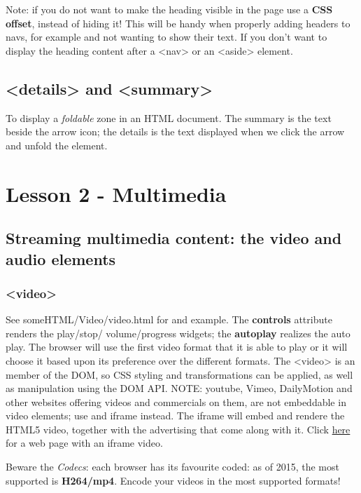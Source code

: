 \documentclass[a4paper,11pt]{book}
\begin{document}
    Note: if you do not want to make the heading visible in the page use a \textbf{CSS offset}, instead of
    hiding it! This will be handy when properly adding headers to navs, for example and not wanting to
    show their text. If you don't want to display the heading content after a <nav> or an <aside> element.

    \section{<details> and <summary>}
    To display a \emph{foldable} zone in an HTML document.
    The summary is the text beside the arrow icon; the details is the text displayed when we click the arrow
    and unfold the element.

\chapter{Lesson 2 - Multimedia}
    \section{Streaming multimedia content: the video and audio elements}
        \subsection{<video>}
        See someHTML/Video/video.html for and example. The \textbf{controls} attribute renders the play/stop/
        volume/progress widgets; the \textbf{autoplay} realizes the auto play. The browser will use the first
        video format that it is able to play or it will choose it based upon its preference over the different
        formats. The <video> is an member of the DOM, so CSS styling and transformations can be applied, as well
        as manipulation using the DOM API. NOTE: youtube, Vimeo, DailyMotion and other websites offering videos
        and commercials on them, are not embeddable in video elements; use and iframe instead. The iframe will
        embed and rendere the HTML5 video, together with the advertising that come along with it.
        Click \href{http://pdata.altervista.org/HTML5/video/iframe/videoIframe.html}{here}
        for a web page with an iframe video.

        Beware the \emph{Codecs}: each browser has its favourite coded: as of 2015, the most supported is \textbf{H264/mp4}.
        Encode your videos in the most supported formats!
\end{document}
